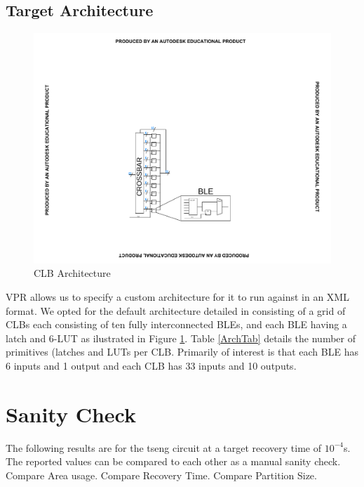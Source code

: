\documentclass[12pt,final,oneside]{dwThesis} %
\begin{document}
   \subsection{Target Architecture}
   \begin{figure}
      \begin{center}
         \includegraphics[clip,trim=8cm 4cm 8cm 8cm]{images/CLB.pdf}
         \caption{\ac{CLB} Architecture}
         \label{ArchFig}
      \end{center}
   \end{figure}
   \ac{VPR} allows us to specify a custom architecture for it to run against in an XML format. We opted for the default architecture detailed in \cite{VPRManual} consisting of a grid of \acp{CLB} each consisting of ten fully interconnected \acp{BLE}, and each \ac{BLE} having a latch and 6-\ac{LUT} as ilustrated in Figure \ref{ArchFig}.
   Table \ref{ArchTab} details the number of primitives (latches and \acp{LUT} per \ac{CLB}. Primarily of interest is that each \ac{BLE} has 6 inputs and 1 output and each \ac{CLB} has 33 inputs and 10 outputs.




   \section{Sanity Check}
   The following results are for the tseng circuit at a target recovery time of $10^{-4}$s. The reported values can be compared to each other as a manual sanity check.
   Compare Area usage.
   Compare Recovery Time.
   Compare Partition Size.
\end{document}
